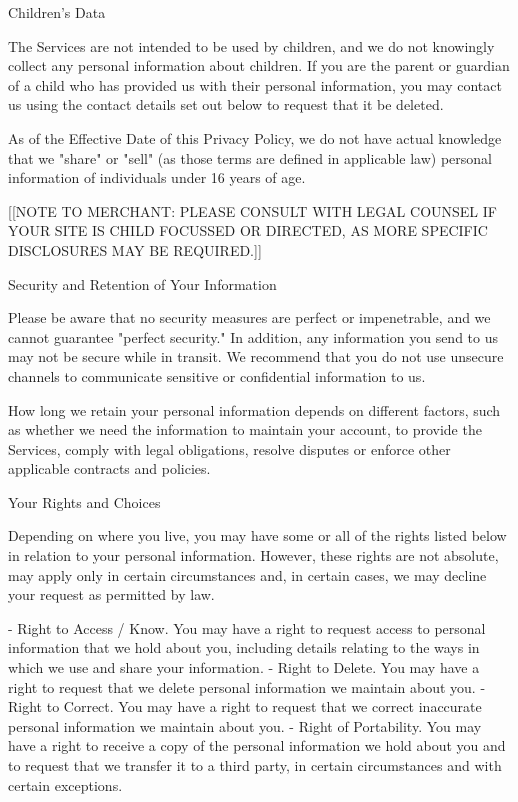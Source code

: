 \documentclass[conference]{IEEEtran}
\begin{document}
Children's Data

The Services are not intended to be used by children, and we do not knowingly collect any personal information about children. If you are the parent or guardian of a child who has provided us with their personal information, you may contact us using the contact details set out below to request that it be deleted.

As of the Effective Date of this Privacy Policy, we do not have actual knowledge that we "share" or "sell" (as those terms are defined in applicable law) personal information of individuals under 16 years of age.

[[NOTE TO MERCHANT: PLEASE CONSULT WITH LEGAL COUNSEL IF YOUR SITE IS CHILD FOCUSSED OR DIRECTED, AS MORE SPECIFIC DISCLOSURES MAY BE REQUIRED.]]

Security and Retention of Your Information

Please be aware that no security measures are perfect or impenetrable, and we cannot guarantee "perfect security." In addition, any information you send to us may not be secure while in transit. We recommend that you do not use unsecure channels to communicate sensitive or confidential information to us.

How long we retain your personal information depends on different factors, such as whether we need the information to maintain your account, to provide the Services, comply with legal obligations, resolve disputes or enforce other applicable contracts and policies.

Your Rights and Choices

Depending on where you live, you may have some or all of the rights listed below in relation to your personal information. However, these rights are not absolute, may apply only in certain circumstances and, in certain cases, we may decline your request as permitted by law.

- Right to Access / Know. You may have a right to request access to personal information that we hold about you, including details relating to the ways in which we use and share your information.
- Right to Delete. You may have a right to request that we delete personal information we maintain about you.
- Right to Correct. You may have a right to request that we correct inaccurate personal information we maintain about you.
- Right of Portability. You may have a right to receive a copy of the personal information we hold about you and to request that we transfer it to a third party, in certain circumstances and with certain exceptions.
\end{document}
